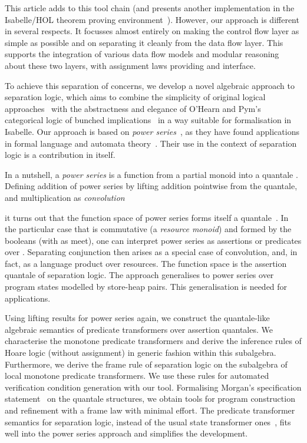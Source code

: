 \documentclass[twoside,runningheads,envcountsame,envcountsect,oribibl,orivec]{llncs}
\begin{document}
This article adds to this tool chain (and presents another
implementation in the Isabelle/HOL theorem proving
environment~\cite{NPW02}).  However, our approach is different in
several respects. It focusses almost entirely on making the control
flow layer as simple as possible and on separating it cleanly from the
data flow layer.  This supports the integration of various data flow
models and modular reasoning about these two layers, with assignment
laws providing and interface.

To achieve this separation of concerns, we develop a novel algebraic
approach to separation logic, which aims to combine the simplicity of
original logical approaches~\cite{OHRY01} with the abstractness and
elegance of O'Hearn and Pym's categorical logic of bunched
implications~\cite{OHearnP99} in a way suitable for formalisation in
Isabelle. Our approach is based on \emph{power series}~\cite{DHS14},
as they have found applications in formal language and automata
theory~\cite{BerstelReutenauer,Handbook}. Their use in the context of
separation logic is  a contribution in itself.

In a nutshell, a \emph{power series} is a function  from a
partial monoid  into a quantale . Defining addition of power
series by lifting addition pointwise from the quantale, and
multiplication as \emph{convolution}

it turns out that the function space  of power series forms
itself a quantale~\cite{DHS14}. In the particular case that  is
commutative (a \emph{resource monoid}) and  formed by the booleans
 (with  as meet), one can interpret power series
as assertions or predicates over .  Separating conjunction then
arises as a special case of convolution, and, in fact, as a language
product over resources. The function space  is the
assertion quantale of separation logic. The approach generalises to
power series over program states modelled by store-heap pairs. This
generalisation is needed for applications.

Using lifting results for power series again, we construct the
quantale-like algebraic semantics of predicate transformers over
assertion quantales. We characterise the monotone predicate
transformers and derive the inference rules of Hoare logic (without
assignment) in generic fashion within this subalgebra. Furthermore, we
derive the frame rule of separation logic on the subalgebra of local
monotone predicate transformers.  We use these rules for automated
verification condition generation with our tool. Formalising Morgan's
specification statement~\cite{Mor98} on the quantale structures, we
obtain tools for program construction and refinement with a frame law
with minimal effort. The predicate transformer semantics for
separation logic, instead of the usual state transformer
ones~\cite{COY07}, fits well into the power series approach and
simplifies the development.
\end{document}
